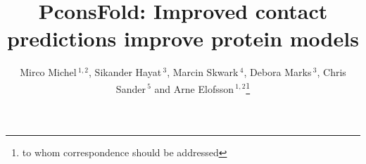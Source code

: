 \documentclass{bioinfo}
\begin{document}

\title[PconsFold]{PconsFold: Improved contact predictions improve
  protein models}
\author[M.Michel \textit{et~al}]{Mirco Michel\,$^{1,2}$, Sikander Hayat\,$^{3}$, Marcin Skwark\,$^{4}$, Debora Marks\,$^{3}$, Chris Sander\,$^{5}$ and Arne Elofsson\,$^{1,2}$\footnote{to whom correspondence should be addressed}}
\address{$^{1}$Department of Biochemistry and Biophysics, Stockholm University, 10691 Stockholm, Sweden, 
$^{2}$Science for Life Laboratory, Box 1031, 17121 Solna, Sweden, 
$^{3}$Department of Systems Biology, Harvard Medical School, Boston, Massachusetts, USA, 
$^{4}$Department of Information and Computer Science, Aalto University, PO Box 15400, FI-00076 Aalto, Finland, and
$^{5}$Computational Biology Center, Memorial Sloan-Kettering Cancer Center, New York, New York, USA}



\maketitle
\end{document}
